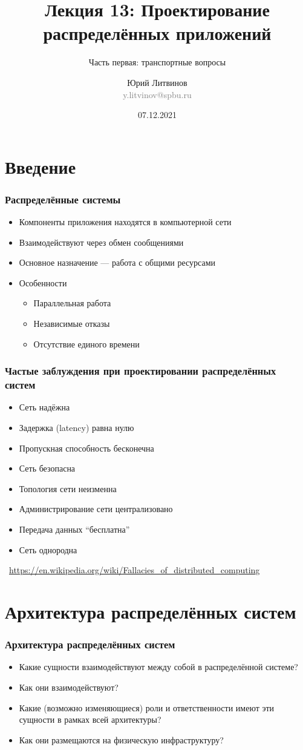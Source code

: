 \documentclass[xetex,mathserif,serif]{beamer}
\title{Лекция 13: Проектирование распределённых приложений}
\subtitle{Часть первая: транспортные вопросы}
\author[Юрий Литвинов]{Юрий Литвинов\\\small{\textcolor{gray}{y.litvinov@spbu.ru}}}
\date{07.12.2021}
\newcommand{\attribution}[1] {
	\vspace{-5mm}\begin{flushright}\begin{scriptsize}\textcolor{gray}{\textcopyright\, #1}\end{scriptsize}\end{flushright}
}
\begin{document}
	
	\frame{\titlepage}

	\section{Введение}

	\begin{frame}
		\frametitle{Распределённые системы}
		\begin{itemize}
			\item Компоненты приложения находятся в компьютерной сети
			\item Взаимодействуют через обмен сообщениями
			\item Основное назначение --- работа с общими ресурсами
			\item Особенности
			\begin{itemize}
				\item Параллельная работа
				\item Независимые отказы
				\item Отсутствие единого времени
			\end{itemize}
		\end{itemize}
	\end{frame}

	\begin{frame}
		\frametitle{Частые заблуждения при проектировании распределённых систем}
		\begin{itemize}
			\item Сеть надёжна
			\item Задержка (latency) равна нулю
			\item Пропускная способность бесконечна
			\item Сеть безопасна
			\item Топология сети неизменна
			\item Администрирование сети централизовано
			\item Передача данных ``бесплатна''
			\item Сеть однородна
		\end{itemize}
		\attribution{\url{https://en.wikipedia.org/wiki/Fallacies_of_distributed_computing}}
	\end{frame}

	\section{Архитектура распределённых систем}

	\begin{frame}
		\frametitle{Архитектура распределённых систем}
		\begin{itemize}
			\item Какие сущности взаимодействуют между собой в распределённой системе?
			\item Как они взаимодействуют?
			\item Какие (возможно изменяющиеся) роли и ответственности имеют эти сущности в рамках всей архитектуры?
			\item Как они размещаются на физическую инфраструктуру?
		\end{itemize}
	\end{frame}
\end{document}
